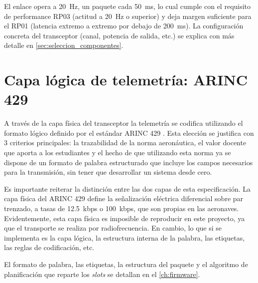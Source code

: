 El enlace opera a \SI{20}{\hertz}, un paquete cada \SI{50}{\milli\second}, lo cual cumple con el requisito de performance RP03 (actitud a \SI{20}{\hertz} o superior) y deja margen suficiente para el RP01 (latencia extremo a extremo por debajo de \SI{200}{\milli\second}). La configuración concreta del transceptor (canal, potencia de salida, etc.) se explica con más detalle en \cref{sec:seleccion_componentes}.


\section{Capa lógica de telemetría: ARINC 429}
\label{sec:arinc_arq}

A través de la capa física del transceptor la telemetría se codifica utilizando el formato lógico definido por el estándar ARINC 429 \cite{arinc429}. Esta elección se justifica con 3 criterios principales: la trazabilidad de la norma aeronáutica, el valor docente que aporta a los estudiantes y el hecho de que utilizando esta norma ya se dispone de un formato de palabra estructurado que incluye los campos necesarios para la transmisión, sin tener que desarrollar un sistema desde cero.


Es importante reiterar la distinción entre las dos capas de esta especificación. La capa física del ARINC 429 define la señalización eléctrica diferencial sobre par trenzado, a tasas de \num{12.5}~kbps o \num{100}~kbps, que son propias en las aeronaves. Evidentemente, esta capa física es imposible de reproducir en este proyecto, ya que el transporte se realiza por radiofrecuencia. En cambio, lo que si se implementa es la capa lógica, la estructura interna de la palabra, las etiquetas, las reglas de codificación, etc.

El formato de palabra, las etiquetas, la estructura del paquete y el algoritmo de planificación que reparte los \textit{slots} se detallan en el \cref{ch:firmware}.

